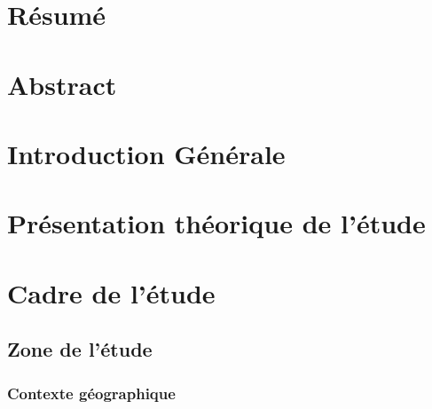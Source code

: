 \documentclass[12pt,a4paper]{report}
\begin{document}
	
	\vspace*{1cm}
	\newpage
	
	\chapter*{Résumé}       %
	\vspace*{1cm}
	\newpage
	
	
	
	\chapter*{Abstract}       %
	\vspace*{1cm}
	\newpage
	
		
	\chapter*{Introduction Générale}       %
	\vspace*{1cm}
	\newpage
	
	
	\chapter{Présentation théorique de l'étude}


	\chapter{Cadre de l'étude}	
		\section{Zone de l'étude}
			\subsection{Contexte géographique}
			
\end{document}
